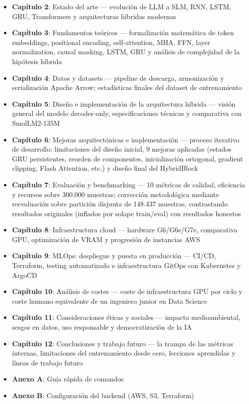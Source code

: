 \begin{itemize}
    \item \textbf{Capítulo 2}: Estado del arte --- evolución de LLM a SLM, RNN, LSTM, GRU, Transformers y arquitecturas híbridas modernas
    \item \textbf{Capítulo 3}: Fundamentos teóricos --- formalización matemática de token embeddings, positional encoding, self-attention, MHA, FFN, layer normalization, causal masking, LSTM, GRU y análisis de complejidad de la hipótesis híbrida
    \item \textbf{Capítulo 4}: Datos y datasets --- pipeline de descarga, armonización y serialización Apache Arrow; estadísticas finales del dataset de entrenamiento
    \item \textbf{Capítulo 5}: Diseño e implementación de la arquitectura híbrida --- visión general del modelo decoder-only, especificaciones técnicas y comparativa con SmolLM2-135M
    \item \textbf{Capítulo 6}: Mejoras arquitectónicas e implementación --- proceso iterativo de desarrollo: limitaciones del diseño inicial, 9 mejoras aplicadas (estados GRU persistentes, reorden de componentes, inicialización ortogonal, gradient clipping, Flash Attention, etc.) y diseño final del HybridBlock
    \item \textbf{Capítulo 7}: Evaluación y benchmarking --- 10 métricas de calidad, eficiencia y recursos sobre 300.000 muestras; corrección metodológica mediante reevaluación sobre partición disjunta de 148.437 muestras, contrastando resultados originales (inflados por solape train/eval) con resultados honestos
    \item \textbf{Capítulo 8}: Infraestructura cloud --- hardware G6/G6e/G7e, comparativa GPU, optimización de VRAM y progresión de instancias AWS
    \item \textbf{Capítulo 9}: MLOps: despliegue y puesta en producción --- CI/CD, Terraform, testing automatizado e infraestructura GitOps con Kubernetes y ArgoCD
    \item \textbf{Capítulo 10}: Análisis de costes --- coste de infraestructura GPU por ciclo y coste humano equivalente de un ingeniero junior en Data Science
    \item \textbf{Capítulo 11}: Consideraciones éticas y sociales --- impacto medioambiental, sesgos en datos, uso responsable y democratización de la IA
    \item \textbf{Capítulo 12}: Conclusiones y trabajo futuro --- la trampa de las métricas internas, limitaciones del entrenamiento desde cero, lecciones aprendidas y líneas de trabajo futuro
    \item \textbf{Anexo A}: Guía rápida de comandos
    \item \textbf{Anexo B}: Configuración del backend (AWS, S3, Terraform)
\end{itemize}